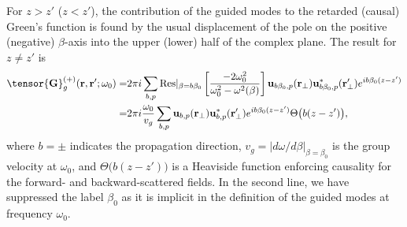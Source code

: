 \documentclass[preprint, aps,pra,onecolumn]{revtex4-1} %
\def\br{\mathbf{r}}
\begin{document}
For $z>z'$ ($z<z'$), the contribution of the guided modes to the retarded (causal) Green's function is found by the 
usual displacement of the pole on the positive (negative) $\beta$-axis into the upper (lower) half of 
the complex plane. The result for $z \neq z'$ is \cite{manga_rao_single_2007}
	\begin{align} 
		\tensor{\mathbf{G}}^{(+)}_g(\br,\br'; \omega_0) = &2\pi i \sum_{b,p}  {\rm Res}\vert_{\beta =b\beta_0} 
\left[\frac{-2 \omega_0^2 }{ \omega_0^2-\omega^2(\beta)}\right]  \mathbf{u}_{b\beta_0, p} 
(\br_\perp)\mathbf{u}^*_{b\beta_0, p} (\br_{\perp}^\prime)e^{ib \beta_0 (z-z')} \nonumber \\
= & 2\pi i \frac{\omega_0}{v_g } \sum_{b,p} \mathbf{u}_{b, p} (\br_\perp)\mathbf{u}^*_{b, p} 
(\br_{\perp}^\prime) e^{i b\beta_0(z-z')} \Theta \big( b(z-z') \big), \label{Eq::GreensGuided}
	\end{align}
where $b=\pm$ indicates the propagation direction, $v_g= \vert d\omega/d\beta \vert_{\beta=\beta_0}$ is the group velocity at $\omega_0$, and $\Theta \big( b(z-z') \big)$ is a Heaviside function enforcing causality for the forward- and backward-scattered fields. In the second line, we have suppressed the label $\beta_0$ as it is implicit in the definition of the guided modes at frequency $\omega_0$. 
\end{document}
